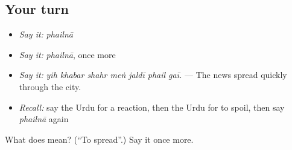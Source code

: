 \subsection*{Your turn}
\begin{itemize}
\raggedright
  \item \emph{Say it:} \emph{phailnā}
  \item \emph{Say it:} \emph{phailnā}, once more
  \item \emph{Say it:} \emph{yih khabar shahr meṅ jaldī phail gaī.} — The news spread quickly through the city.
  \item \emph{Recall:} say the Urdu for a reaction, then the Urdu for to spoil, then say \emph{phailnā} again
\end{itemize}

\begin{tcolorbox}[breakable,colback=teal!4,colframe=teal!35!black,title={Before you move on}]
What does  mean? (\textquotedblleft{}To spread\textquotedblright{}.) Say it once more.
\end{tcolorbox}
